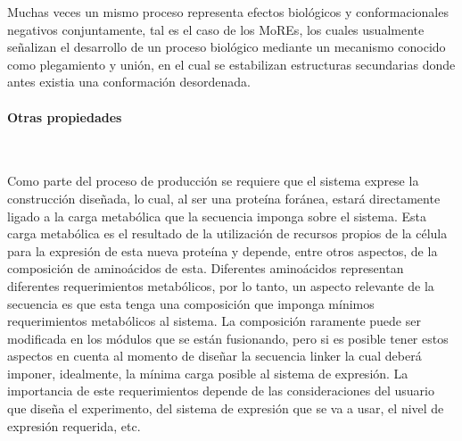 Muchas veces un mismo proceso representa efectos biológicos y conformacionales negativos conjuntamente, tal es el caso de los MoREs, los cuales usualmente señalizan 
el desarrollo de un proceso biológico mediante un mecanismo conocido como plegamiento y unión, en el cual se estabilizan estructuras secundarias donde antes existia una conformación desordenada.



\paragraph{Otras propiedades} \hspace{0pt} \\ \indent 


Como parte del proceso de producción se requiere que el sistema exprese la construcción diseñada, lo cual, al ser una proteína foránea, estará directamente ligado a la carga
metabólica que la secuencia imponga sobre el sistema\cite{glick1995metabolic}. Esta carga metabólica es el resultado de la utilización de recursos propios de la célula para la expresión de esta nueva proteína y depende, entre otros aspectos, 
de la composición de aminoácidos de esta. 
Diferentes aminoácidos representan diferentes requerimientos metabólicos, por lo tanto, un aspecto relevante de la secuencia es que esta tenga una composición que imponga mínimos requerimientos metabólicos al sistema. 
La composición raramente puede ser modificada en los módulos que se están fusionando, pero si es posible tener estos aspectos en cuenta al momento de diseñar la secuencia linker la cual deberá imponer, idealmente, 
la mínima carga posible al sistema de expresión. La importancia de este requerimientos depende de las consideraciones del usuario que diseña el experimento, del sistema de expresión que se va a usar, el nivel de expresión requerida, etc.

